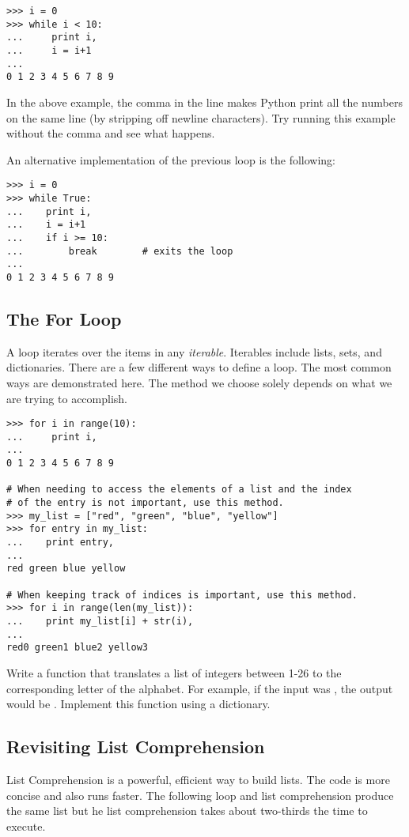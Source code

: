 \begin{lstlisting}
>>> i = 0
>>> while i < 10:        
...     print i,            
...     i = i+1       
...     
0 1 2 3 4 5 6 7 8 9
\end{lstlisting}
In the above example, the comma in the line  makes Python print all the numbers on the same line (by stripping off newline characters). Try running this example without the comma and see what happens.

An alternative implementation of the previous  loop is the following:
\begin{lstlisting}
>>> i = 0
>>> while True:
...    print i,
...    i = i+1
...    if i >= 10:
...        break		# exits the loop
...
0 1 2 3 4 5 6 7 8 9
\end{lstlisting}

\subsection*{The For Loop}
A  loop iterates over the items in any \emph{iterable}. Iterables include lists, sets, and dictionaries.  There are a few different ways to define a  loop.  The most common ways are demonstrated here. The method we choose solely depends on what we are trying to accomplish.

\begin{lstlisting}
>>> for i in range(10):
...     print i,
...     
0 1 2 3 4 5 6 7 8 9

# When needing to access the elements of a list and the index
# of the entry is not important, use this method.
>>> my_list = ["red", "green", "blue", "yellow"]
>>> for entry in my_list:
...    print entry,
...
red green blue yellow

# When keeping track of indices is important, use this method.
>>> for i in range(len(my_list)):
...    print my_list[i] + str(i),
...
red0 green1 blue2 yellow3
\end{lstlisting}

\begin{problem}
Write a function that translates a list of integers between 1-26 to the corresponding letter of the alphabet. For example, if the input was \li{[1, 2, 3]}, the output would be \li{["a", "b", "c"]}. Implement this function using a dictionary. 
\end{problem}


\subsection*{Revisiting List Comprehension}
List Comprehension is a powerful, efficient way to build lists.  The code is more concise and also runs faster.  The following  loop and list comprehension produce the same list but he list comprehension takes about two-thirds the time to execute.

